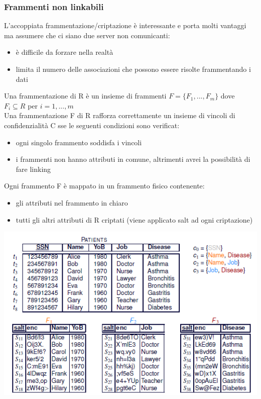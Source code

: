 \subsubsection{Frammenti non linkabili}
L'accoppiata frammentazione/criptazione è interessante e porta molti vantaggi ma assumere che ci siano due server non comunicanti:
\begin{itemize}
    \item è difficile da forzare nella realtà
    \item limita il numero delle associazioni che possono essere risolte frammentando i dati
\end{itemize}
Una frammentazione di R è un insieme di frammenti \( F = \{F_1,..., F_m\}\) dove \(F_i \subseteq R\) per \(i=1,...,m\)\\
Una frammentazione F di R rafforza correttamente un insieme di vincoli di confidenzialità C sse le seguenti condizioni sono verificat:
\begin{itemize}
    \item ogni singolo frammento soddisfa i vincoli
    \item i frammenti non hanno attributi in comune, altrimenti avrei la possibilità di fare linking
\end{itemize}
Ogni frammento F è mappato in un frammento fisico contenente:
\begin{itemize}
    \item gli attributi nel frammento in chiaro
    \item tutti gli altri attributi di R criptati (viene applicato salt ad ogni criptazione)
\end{itemize}
\begin{center}
    \includegraphics[scale=0.7]{img/nonlink.png}
\end{center}
